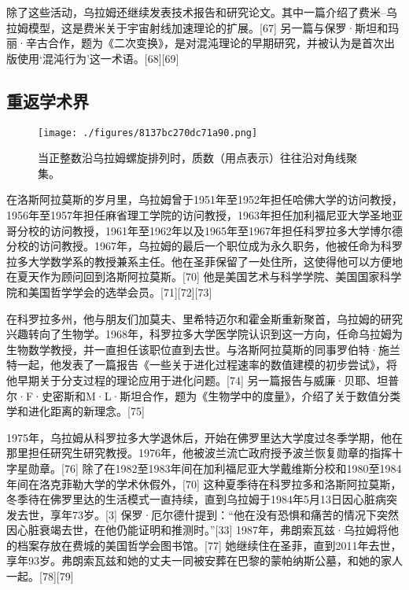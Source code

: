 除了这些活动，乌拉姆还继续发表技术报告和研究论文。其中一篇介绍了费米–乌拉姆模型，这是费米关于宇宙射线加速理论的扩展。[67] 另一篇与保罗·斯坦和玛丽·辛古合作，题为《二次变换》，是对混沌理论的早期研究，并被认为是首次出版使用‘混沌行为’这一术语。[68][69]
\subsection{重返学术界}
\begin{figure}[ht]
\centering
\texttt{[image: ./figures/8137bc270dc71a90.png]}
\caption{当正整数沿乌拉姆螺旋排列时，质数（用点表示）往往沿对角线聚集。} \label{fig_Ulam_8}
\end{figure}
在洛斯阿拉莫斯的岁月里，乌拉姆曾于1951年至1952年担任哈佛大学的访问教授，1956年至1957年担任麻省理工学院的访问教授，1963年担任加利福尼亚大学圣地亚哥分校的访问教授，1961年至1962年以及1965年至1967年担任科罗拉多大学博尔德分校的访问教授。1967年，乌拉姆的最后一个职位成为永久职务，他被任命为科罗拉多大学数学系的教授兼系主任。他在圣菲保留了一处住所，这使得他可以方便地在夏天作为顾问回到洛斯阿拉莫斯。[70] 他是美国艺术与科学学院、美国国家科学院和美国哲学学会的选举会员。[71][72][73]

在科罗拉多州，他与朋友们加莫夫、里希特迈尔和霍金斯重新聚首，乌拉姆的研究兴趣转向了生物学。1968年，科罗拉多大学医学院认识到这一方向，任命乌拉姆为生物数学教授，并一直担任该职位直到去世。与洛斯阿拉莫斯的同事罗伯特·施兰特一起，他发表了一篇报告《一些关于进化过程速率的数值建模的初步尝试》，将他早期关于分支过程的理论应用于进化问题。[74] 另一篇报告与威廉·贝耶、坦普尔·F·史密斯和M·L·斯坦合作，题为《生物学中的度量》，介绍了关于数值分类学和进化距离的新理念。[75]

1975年，乌拉姆从科罗拉多大学退休后，开始在佛罗里达大学度过冬季学期，他在那里担任研究生研究教授。1976年，他被波兰流亡政府授予波兰恢复勋章的指挥十字星勋章。[76] 除了在1982至1983年间在加利福尼亚大学戴维斯分校和1980至1984年间在洛克菲勒大学的学术休假外，[70] 这种夏季待在科罗拉多和洛斯阿拉莫斯，冬季待在佛罗里达的生活模式一直持续，直到乌拉姆于1984年5月13日因心脏病突发去世，享年73岁。[3] 保罗·厄尔德什提到：“他在没有恐惧和痛苦的情况下突然因心脏衰竭去世，在他仍能证明和推测时。”[33] 1987年，弗朗索瓦兹·乌拉姆将他的档案存放在费城的美国哲学会图书馆。[77] 她继续住在圣菲，直到2011年去世，享年93岁。弗朗索瓦兹和她的丈夫一同被安葬在巴黎的蒙帕纳斯公墓，和她的家人一起。[78][79]

